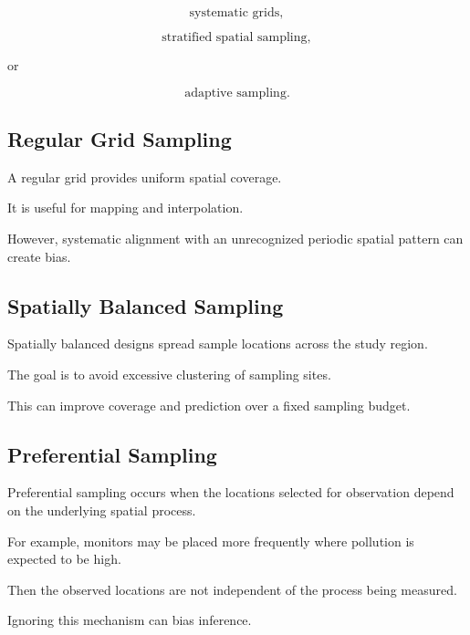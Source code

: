 \[
\boxed{
\text{systematic grids},
}
\]

\[
\boxed{
\text{stratified spatial sampling},
}
\]

or

\[
\boxed{
\text{adaptive sampling}.
}
\]

\subsection{Regular Grid Sampling}
\label{subsec:regular-grid-sampling}

A regular grid provides uniform spatial coverage.

It is useful for mapping and interpolation.

However, systematic alignment with an unrecognized periodic spatial
pattern can create bias.

\subsection{Spatially Balanced Sampling}
\label{subsec:spatially-balanced-sampling}

Spatially balanced designs spread sample locations across the study
region.

The goal is to avoid excessive clustering of sampling sites.

This can improve coverage and prediction over a fixed sampling budget.

\subsection{Preferential Sampling}
\label{subsec:preferential-sampling}

Preferential sampling occurs when the locations selected for observation
depend on the underlying spatial process.

For example, monitors may be placed more frequently where pollution is
expected to be high.

Then the observed locations are not independent of the process being
measured.

Ignoring this mechanism can bias inference.

